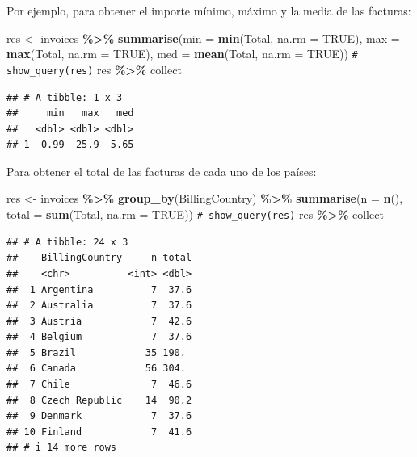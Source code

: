 \documentclass[
]{book}
\newenvironment{Shaded}{\begin{snugshade}}{\end{snugshade}}
\newcommand{\AttributeTok}[1]{\textcolor[rgb]{0.13,0.29,0.53}{#1}}
\newcommand{\CommentTok}[1]{\textcolor[rgb]{0.56,0.35,0.01}{\textit{#1}}}
\newcommand{\ConstantTok}[1]{\textcolor[rgb]{0.56,0.35,0.01}{#1}}
\newcommand{\FunctionTok}[1]{\textcolor[rgb]{0.13,0.29,0.53}{\textbf{#1}}}
\newcommand{\NormalTok}[1]{#1}
\newcommand{\OtherTok}[1]{\textcolor[rgb]{0.56,0.35,0.01}{#1}}
\newcommand{\SpecialCharTok}[1]{\textcolor[rgb]{0.81,0.36,0.00}{\textbf{#1}}}
\theoremstyle{break}
\theoremstyle{nonumberplain}
\renewcommand{\CommentTok}[1]{\textcolor[rgb]{0.41,0.41,0.41}{\texttt{#1}}}
\begin{document}
Por ejemplo, para obtener el importe mínimo, máximo y la media de las facturas:

\begin{Shaded}
\begin{Highlighting}[]
\NormalTok{res }\OtherTok{\textless{}{-}}\NormalTok{ invoices }\SpecialCharTok{\%\textgreater{}\%} \FunctionTok{summarise}\NormalTok{(}\AttributeTok{min =} \FunctionTok{min}\NormalTok{(Total, }\AttributeTok{na.rm =} \ConstantTok{TRUE}\NormalTok{), }
                        \AttributeTok{max =} \FunctionTok{max}\NormalTok{(Total, }\AttributeTok{na.rm =} \ConstantTok{TRUE}\NormalTok{), }\AttributeTok{med =} \FunctionTok{mean}\NormalTok{(Total, }\AttributeTok{na.rm =} \ConstantTok{TRUE}\NormalTok{))}
\CommentTok{\# show\_query(res)}
\NormalTok{res  }\SpecialCharTok{\%\textgreater{}\%}\NormalTok{ collect}
\end{Highlighting}
\end{Shaded}

\begin{verbatim}
## # A tibble: 1 x 3
##     min   max   med
##   <dbl> <dbl> <dbl>
## 1  0.99  25.9  5.65
\end{verbatim}

Para obtener el total de las facturas de cada uno de los países:

\begin{Shaded}
\begin{Highlighting}[]
\NormalTok{res }\OtherTok{\textless{}{-}}\NormalTok{ invoices }\SpecialCharTok{\%\textgreater{}\%} \FunctionTok{group\_by}\NormalTok{(BillingCountry) }\SpecialCharTok{\%\textgreater{}\%} 
          \FunctionTok{summarise}\NormalTok{(}\AttributeTok{n =} \FunctionTok{n}\NormalTok{(), }\AttributeTok{total =} \FunctionTok{sum}\NormalTok{(Total, }\AttributeTok{na.rm =} \ConstantTok{TRUE}\NormalTok{))}
\CommentTok{\# show\_query(res)}
\NormalTok{res  }\SpecialCharTok{\%\textgreater{}\%}\NormalTok{ collect}
\end{Highlighting}
\end{Shaded}

\begin{verbatim}
## # A tibble: 24 x 3
##    BillingCountry     n total
##    <chr>          <int> <dbl>
##  1 Argentina          7  37.6
##  2 Australia          7  37.6
##  3 Austria            7  42.6
##  4 Belgium            7  37.6
##  5 Brazil            35 190. 
##  6 Canada            56 304. 
##  7 Chile              7  46.6
##  8 Czech Republic    14  90.2
##  9 Denmark            7  37.6
## 10 Finland            7  41.6
## # i 14 more rows
\end{verbatim}
\end{document}

